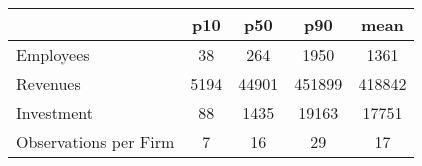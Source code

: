 \begin{tabular}{l*{4}{c}}
\toprule
                    &         p10&         p50&         p90&        mean\\
\midrule
Employees           &          38&         264&        1950&        1361\\
Revenues            &        5194&       44901&      451899&      418842\\
Investment          &          88&        1435&       19163&       17751\\
Observations per Firm&           7&          16&          29&          17\\
\bottomrule
\end{tabular}
